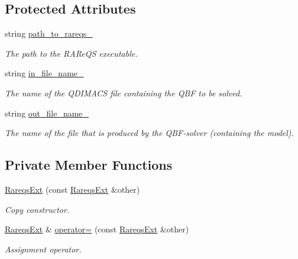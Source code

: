 \subsection*{Protected Attributes}
\begin{DoxyCompactItemize}
\item 
string \hyperlink{classRareqsExt_aef57627c91c546f99fbbf0c13c4bd825}{path\-\_\-to\-\_\-rareqs\-\_\-}
\begin{DoxyCompactList}\small\item\em The path to the R\-A\-Re\-Q\-S executable. \end{DoxyCompactList}\item 
string \hyperlink{classExtQBFSolver_a04d2ff483c22a11344e46d66ae7e76b1}{in\-\_\-file\-\_\-name\-\_\-}
\begin{DoxyCompactList}\small\item\em The name of the Q\-D\-I\-M\-A\-C\-S file containing the Q\-B\-F to be solved. \end{DoxyCompactList}\item 
string \hyperlink{classExtQBFSolver_a0efb35aa9b807dec521ad3406eaf664d}{out\-\_\-file\-\_\-name\-\_\-}
\begin{DoxyCompactList}\small\item\em The name of the file that is produced by the Q\-B\-F-\/solver (containing the model). \end{DoxyCompactList}\end{DoxyCompactItemize}
\subsection*{Private Member Functions}
\begin{DoxyCompactItemize}
\item 
\hyperlink{classRareqsExt_a1cfd3d3c4be83943a90d59977c56cfcc}{Rareqs\-Ext} (const \hyperlink{classRareqsExt}{Rareqs\-Ext} \&other)
\begin{DoxyCompactList}\small\item\em Copy constructor. \end{DoxyCompactList}\item 
\hyperlink{classRareqsExt}{Rareqs\-Ext} \& \hyperlink{classRareqsExt_afece414bb63ea09be2f332fe414fecd5}{operator=} (const \hyperlink{classRareqsExt}{Rareqs\-Ext} \&other)
\begin{DoxyCompactList}\small\item\em Assignment operator. \end{DoxyCompactList}\end{DoxyCompactItemize}


